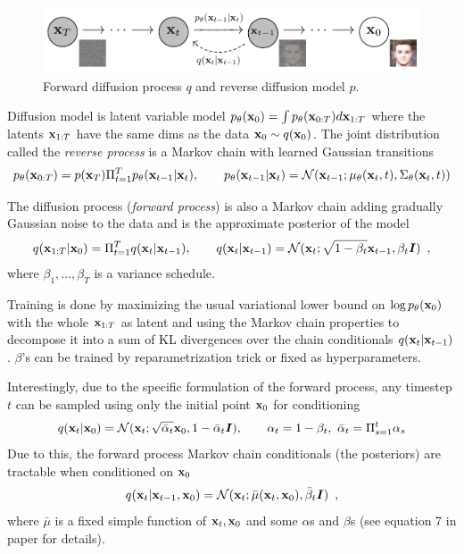 \begin{figure}[ht]
\centering
\includegraphics[width=12cm]{diffusion_Figure1.png}
\caption{Forward diffusion process $q$ and reverse diffusion model $p$.}
\end{figure}
Diffusion model is latent variable model 
$p_{\theta}({\mathbf{x}}_0) = \int p_{\theta}({\mathbf{x}}_{0:T}) d{\mathbf{x}}_{1:T}$ where the latents ${\mathbf{x}}_{1:T}$ have the same dims as the data ${\mathbf{x}}_0 \sim q({\mathbf{x}}_0)$.
The joint distribution called the \emph{reverse process} is a Markov chain with learned Gaussian transitions
\begin{align*}
p_{\theta}({\mathbf{x}}_{0:T}) = p({\mathbf{x}}_T) \Pi_{t=1}^T p_{\theta}({\mathbf{x}}_{t-1} \vert {\mathbf{x}}_{t}), \qquad p_{\theta}({\mathbf{x}}_{t-1} \vert {\mathbf{x}}_{t}) = \mathcal{N}({\mathbf{x}}_{t-1}; \mu_{\theta}({\mathbf{x}}_t, t), \Sigma_{\theta}({\mathbf{x}}_t, t))
\end{align*}

The diffusion process (\emph{forward process}) is also a Markov chain adding gradually Gaussian noise to the data and is the approximate posterior of the model
\begin{align*}
q({\mathbf{x}}_{1:T} \vert {\mathbf{x}}_0) = \Pi_{t=1}^T q({\mathbf{x}}_{t} \vert {\mathbf{x}}_{t-1}), \qquad q({\mathbf{x}}_{t} \vert {\mathbf{x}}_{t-1}) = \mathcal{N}({\mathbf{x}}_{t}; \sqrt{1 - \beta_t}{\mathbf{x}}_{t-1}, \beta_t {\bm{I}}) \enspace , 
\end{align*}
where $\beta_1, \ldots, \beta_T$ is a variance schedule.

Training is done by maximizing the usual variational lower bound on $\log p_{\theta}({\mathbf{x}}_0)$ with the whole ${\mathbf{x}}_{1:T}$ as latent and using the Markov chain properties to decompose it into a sum of KL divergences over the chain conditionals $q({\mathbf{x}}_{t} \vert {\mathbf{x}}_{t-1})$.
$\beta$'s can be trained by reparametrization trick or fixed as hyperparameters.

Interestingly, due to the specific formulation of the forward process, any timestep $t$ can be sampled using only the initial point ${\mathbf{x}}_0$ for conditioning 
\begin{align*}
q({\mathbf{x}}_{t} \vert {\mathbf{x}}_0) = \mathcal{N}({\mathbf{x}}_{t}; \sqrt{\bar\alpha_t}{\mathbf{x}}_{0}, 1-\bar\alpha_t {\bm{I}}), \qquad \alpha_t = 1 - \beta_t, \ \bar\alpha_t = \Pi_{s=1}^t \alpha_s
\end{align*}
Due to this, the forward process Markov chain conditionals (the posteriors) are tractable when conditioned on ${\mathbf{x}}_0$
\begin{align*}
q({\mathbf{x}}_{t} \vert {\mathbf{x}}_{t-1}, {\mathbf{x}}_0) = \mathcal{N}({\mathbf{x}}_{t}; \bar\mu({\mathbf{x}}_t, {\mathbf{x}}_0), \bar\beta_t {\bm{I}}) \enspace ,
\end{align*}
where $\bar\mu$ is a fixed simple function of ${\mathbf{x}}_t, {\mathbf{x}}_0$ and some $\alpha$s and $\beta$s (see equation 7 in paper for details).

